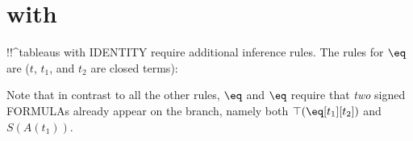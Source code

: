 \documentclass[10pt,a4paper]{article}
\newcommand*{\olup}[1]{\MakeUppercase{#1}}
\theoremstyle{plain}
\theoremstyle{definition}
\theoremstyle{remark}
\newcommand*{\olfileid}[3]{}
\newcommand*{\olsection}[1]{\section*{#1}}
\providecommand{\AxiomC}[1]{}
\providecommand{\UnaryInfC}[1]{}
\providecommand{\RightLabel}[1]{}
\providecommand{\noLine}{}
\providecommand{\DisplayProof}{}
\providecommand{\sFmla}[2]{#1(#2)}
\providecommand{\True}{\top}
\providecommand{\False}{\bot}
\providecommand{\TRule}[1]{}
\begin{document}



\olfileid{fol}{tab}{ide}

\olsection{ with }

!!^{tableau}s with \olup{identity} require additional inference rules.
The rules for $\eq$ are ($t$, $t_1$, and $t_2$ are closed terms):

\begin{defish}
\AxiomC{}
\RightLabel{$\eq$}
\UnaryInfC{\sFmla{\True}{\eq[t][t]}}
\DisplayProof
\hfill
\AxiomC{\sFmla{\True}{\eq[t_1][t_2]}}
\noLine
\UnaryInfC{\sFmla{\True}{A(t_1)}}
\RightLabel{$\TRule{\True}{\eq}$}
\UnaryInfC{\sFmla{\True}{A(t_2)}}
\DisplayProof
\hfill
\AxiomC{\sFmla{\True}{\eq[t_1][t_2]}}
\noLine
\UnaryInfC{\sFmla{\False}{A(t_1)}}
\RightLabel{$\TRule{\False}{\eq}$}
\UnaryInfC{\sFmla{\False}{A(t_2)}}
\DisplayProof
\end{defish}
Note that in contrast to all the other rules, $\TRule{\True}{\eq}$ and
$\TRule{\False}{\eq}$ require that \emph{two} signed \olup{formula}s
already appear on the branch, namely both $\sFmla{\True}{\eq[t_1][t_2]}$
and $\sFmla{S}{A(t_1)}$.
\end{document}
